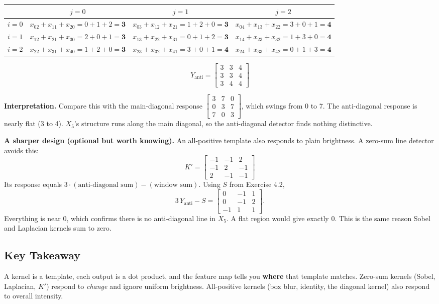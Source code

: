 \begin{center}
\begin{tabular}{cccc}
\toprule
 & $j=0$ & $j=1$ & $j=2$ \\
\midrule
$i=0$ & $x_{02}+x_{11}+x_{20} = 0+1+2 = \mathbf{3}$ & $x_{03}+x_{12}+x_{21} = 1+2+0 = \mathbf{3}$ & $x_{04}+x_{13}+x_{22} = 3+0+1 = \mathbf{4}$ \\
$i=1$ & $x_{12}+x_{21}+x_{30} = 2+0+1 = \mathbf{3}$ & $x_{13}+x_{22}+x_{31} = 0+1+2 = \mathbf{3}$ & $x_{14}+x_{23}+x_{32} = 1+3+0 = \mathbf{4}$ \\
$i=2$ & $x_{22}+x_{31}+x_{40} = 1+2+0 = \mathbf{3}$ & $x_{23}+x_{32}+x_{41} = 3+0+1 = \mathbf{4}$ & $x_{24}+x_{33}+x_{42} = 0+1+3 = \mathbf{4}$ \\
\bottomrule
\end{tabular}
\end{center}
\[
Y_{\text{anti}} = \begin{bmatrix}3&3&4\\3&3&4\\3&4&4\end{bmatrix}
\]

\textbf{Interpretation.} Compare this with the main-diagonal response $\begin{bmatrix}3&7&0\\0&3&7\\7&0&3\end{bmatrix}$, which swings from 0 to 7. The anti-diagonal response is nearly flat (3 to 4). $X_5$'s structure runs along the main diagonal, so the anti-diagonal detector finds nothing distinctive.

\textbf{A sharper design (optional but worth knowing).} An all-positive template also responds to plain brightness. A zero-sum line detector avoids this:
\[
K' = \begin{bmatrix}-1&-1&2\\-1&2&-1\\2&-1&-1\end{bmatrix}
\]
Its response equals $3\cdot(\text{anti-diagonal sum}) - (\text{window sum})$. Using $S$ from Exercise 4.2,
\[
3\,Y_{\text{anti}} - S = \begin{bmatrix}0&-1&1\\0&-1&2\\-1&1&1\end{bmatrix}.
\]
Everything is near 0, which confirms there is no anti-diagonal line in $X_5$. A flat region would give exactly 0. This is the same reason Sobel and Laplacian kernels sum to zero.

\subsection*{Key Takeaway}

A kernel is a template, each output is a dot product, and the feature map tells you \textbf{where} that template matches. Zero-sum kernels (Sobel, Laplacian, $K'$) respond to \emph{change} and ignore uniform brightness. All-positive kernels (box blur, identity, the diagonal kernel) also respond to overall intensity.